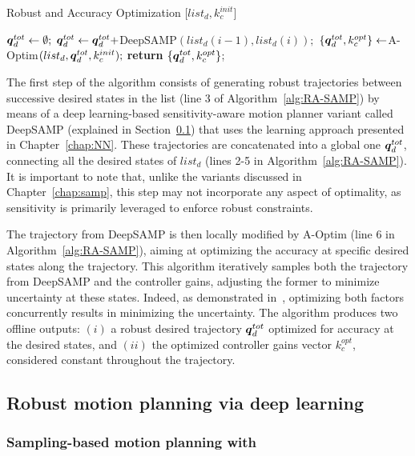 \begin{algorithm}[htp]
\caption{Robust and Accuracy Optimization [$list_{d}, k_{c}^{init}$]}\label{alg:RA-SAMP}
\begin{algorithmic}[1]
\State $\boldsymbol{q}_d^{tot} \gets \emptyset;$
    \State $\boldsymbol{q}_d^{tot} \gets \boldsymbol{q}_d^{tot} + $DeepSAMP$(list_{d}(i-1),list_{d}(i));$
\EndFor
\State $\left \{ \boldsymbol{q}_d^{tot}, k_{c}^{opt} \right \} \gets $A-Optim$(list_{d},\boldsymbol{q}_d^{tot}, k_{c}^{init});$
\State \textbf{return} $\left \{ \boldsymbol{q}_d^{tot}, k_{c}^{opt}  \right \}$;
\end{algorithmic}
\end{algorithm}

The first step of the algorithm consists of generating robust trajectories between successive desired states in the list (line 3 of Algorithm~\ref{alg:RA-SAMP}) by means of a deep learning-based sensitivity-aware motion planner variant called DeepSAMP (explained in Section~\ref{sec:RSAMP}) that uses the learning approach presented in Chapter~\ref{chap:NN}.
These trajectories are concatenated into a global one $\boldsymbol{q}_d^{tot}$, connecting all the desired states of $list_{d}$ (lines 2-5 in Algorithm~\ref{alg:RA-SAMP}). 
It is important to note that, unlike the variants discussed in Chapter~\ref{chap:samp}, this step may not incorporate any aspect of optimality, as sensitivity is primarily leveraged to enforce robust constraints.

The trajectory from DeepSAMP is then locally modified by A-Optim (line 6 in Algorithm~\ref{alg:RA-SAMP}), aiming at optimizing the accuracy at specific desired states along the trajectory. 
This algorithm iteratively samples both the trajectory from DeepSAMP and the controller gains, adjusting the former to minimize uncertainty at these states. 
Indeed, as demonstrated in~\cite{AliIROS}, optimizing both factors concurrently results in minimizing the uncertainty.
The algorithm produces two offline outputs: $(i)$ a robust desired trajectory $\boldsymbol{q}_d^{tot}$ optimized for accuracy at the desired states, and $(ii)$ the optimized controller gains vector $k_{c}^{opt}$, considered constant throughout the trajectory.

\subsection{Robust motion planning via deep learning}\label{sec:RSAMP}

\subsubsection{Sampling-based motion planning with }

